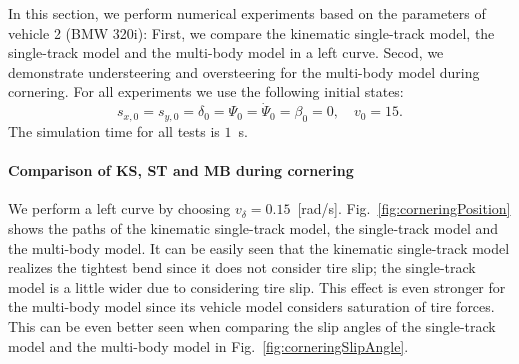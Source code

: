 \documentclass[11pt,a4paper]{article}
\renewcommand{\^}[1]{^{(#1)}}
\begin{document}
In this section, we perform numerical experiments based on the parameters of vehicle 2 (BMW 320i): First, we compare the kinematic single-track model, the single-track model and the multi-body model in a left curve. Secod, we demonstrate understeering and oversteering for the multi-body model during cornering. For all experiments we use the following initial states:
\begin{equation*}
 s_{x,0} = s_{y,0} = \delta_0 = \Psi_0 = \dot{\Psi}_0 = \beta_0 = 0, \quad v_0 = 15.
\end{equation*}
The simulation time for all tests is $1$~s.

\paragraph{Comparison of KS, ST and MB during cornering}

We perform a left curve by choosing $v_\delta = 0.15$~[rad/s]. Fig.~\ref{fig:corneringPosition} shows the paths of the kinematic single-track model, the single-track model and the multi-body model. It can be easily seen that the kinematic single-track model realizes the tightest bend since it does not consider tire slip; the single-track model is a little wider due to considering tire slip. This effect is even stronger for the multi-body model since its vehicle model considers saturation of tire forces. This can be even better seen when comparing the slip angles of the single-track model and the multi-body model in Fig.~\ref{fig:corneringSlipAngle}.
\end{document}
